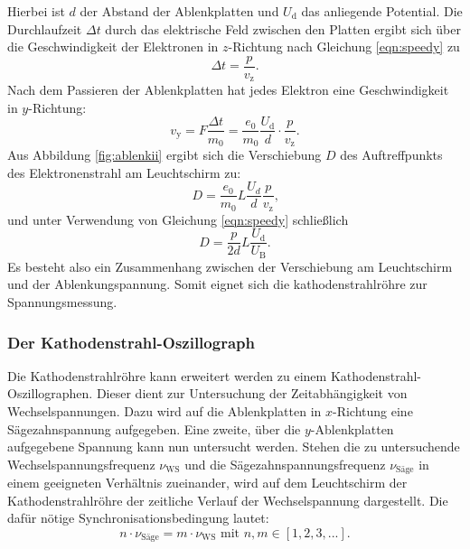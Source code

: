 Hierbei ist $d$ der Abstand der Ablenkplatten und $U_\mathrm{d}$ das anliegende Potential.
Die Durchlaufzeit $\Delta t$ durch das elektrische Feld zwischen den Platten ergibt sich über die Geschwindigkeit der Elektronen in $z$-Richtung nach Gleichung \eqref{eqn:speedy} zu
\begin{equation}
  \Delta t=\frac{p}{v_\mathrm{z}} \text{.}
\end{equation}
Nach dem Passieren der Ablenkplatten hat jedes Elektron eine Geschwindigkeit in $y$-Richtung:
\begin{equation}
  v_\mathrm{y}=F \frac{\Delta t}{m_0}=\frac{e_0}{m_0}\frac{U_\mathrm{d}}{d}\cdot\frac{p}{v_\mathrm{z}} \text{.}
\end{equation}
Aus Abbildung \ref{fig:ablenkii} ergibt sich die Verschiebung $D$ des Auftreffpunkts des Elektronenstrahl am Leuchtschirm zu:
\begin{equation}
    D=\frac{e_0}{m_0}L\frac{U_d}{d}\frac{p}{v_\mathrm{z}} \text{,}
\end{equation}
und unter Verwendung von Gleichung \eqref{eqn:speedy} schließlich
\begin{equation}
  D=\frac{p}{2d}L\frac{U_\mathrm{d}}{U_\mathrm{B}} \text{.}
\end{equation}
Es besteht also ein Zusammenhang zwischen der Verschiebung am Leuchtschirm und der Ablenkungspannung. Somit eignet sich die kathodenstrahlröhre zur Spannungsmessung.
\subsubsection{Der Kathodenstrahl-Oszillograph}
Die Kathodenstrahlröhre kann erweitert werden zu einem Kathodenstrahl-Oszillographen.
Dieser dient zur Untersuchung der Zeitabhängigkeit von Wechselspannungen.
Dazu wird auf die Ablenkplatten in $x$-Richtung eine Sägezahnspannung aufgegeben. Eine zweite, über die $y$-Ablenkplatten aufgegebene Spannung kann nun untersucht werden.
Stehen die zu untersuchende Wechselspannungsfrequenz $\nu_\mathrm{WS}$ und die Sägezahnspannungsfrequenz $\nu_\mathrm{Säge}$ in einem geeigneten Verhältnis zueinander, wird auf dem Leuchtschirm der Kathodenstrahlröhre der zeitliche Verlauf der Wechselspannung dargestellt.
Die dafür nötige Synchronisationsbedingung lautet:
\begin{equation}
    n\cdot \nu_\mathrm{Säge}=m \cdot \nu_\mathrm{WS} \text{ mit } n,m \in [1,2,3,...] \text{.}
\end{equation}

